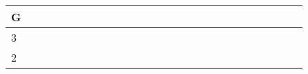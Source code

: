 \documentclass{article}
\begin{document}
\begin{table}
\begin{tabular}{@{}llllllllllllllllllllllllll@{}}
G & \cellcolor{grey}   & \cellcolor{blue} & \cellcolor{blue}   & \cellcolor{yellow} & \cellcolor{blue} & \cellcolor{red}    & \cellcolor{yellow} & \cellcolor{orange} & \cellcolor{red}    & \cellcolor{purple} & \cellcolor{orange} & \cellcolor{green} & \cellcolor{yellow} & \cellcolor{blue} & \cellcolor{blue}   & \cellcolor{purple} & \cellcolor{grey}   & \cellcolor{purple} & \cellcolor{yellow} & \cellcolor{orange} & \cellcolor{blue}   & \cellcolor{yellow} & \cellcolor{green} & \cellcolor{orange} & \cellcolor{green}  \\ \hline
3 & \cellcolor{grey}   & \cellcolor{blue} & \cellcolor{blue}   & \cellcolor{yellow} & \cellcolor{blue} & \cellcolor{blue}   & \cellcolor{yellow} & \cellcolor{blue}   & \cellcolor{red}    & \cellcolor{purple} & \cellcolor{orange} & \cellcolor{blue}  & \cellcolor{yellow} & \cellcolor{blue} & \cellcolor{blue}   & \cellcolor{purple} & \cellcolor{grey}   & \cellcolor{purple} & \cellcolor{blue}   & \cellcolor{orange} & \cellcolor{blue}   & \cellcolor{blue}   & \cellcolor{green} & \cellcolor{orange} & \cellcolor{blue}  \\ \hline
2 & \cellcolor{blue}   & \cellcolor{blue} & \cellcolor{blue}   & \cellcolor{yellow} & \cellcolor{blue} & \cellcolor{blue}   & \cellcolor{blue}   & \cellcolor{blue}   & \cellcolor{blue}   & \cellcolor{purple} & \cellcolor{blue}   & \cellcolor{blue}  & \cellcolor{blue}   & \cellcolor{blue} & \cellcolor{blue}   & \cellcolor{purple} & \cellcolor{blue}   & \cellcolor{blue}   & \cellcolor{blue}   & \cellcolor{blue}   & \cellcolor{blue}   & \cellcolor{blue}   & \cellcolor{green} & \cellcolor{blue}   & \cellcolor{blue}   \\ \bottomrule
\end{tabular}
\vspace{1ex}


\end{table}
\end{document}
